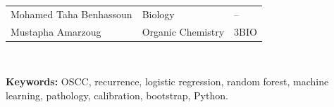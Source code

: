 \documentclass[11pt,a4paper]{article}
\begin{document}
\begin{titlepage}
\begin{tabular}{|l|l|l|}
Mohamed Taha Benhassoun & Biology & -- \\

Mustapha Amarzoug & Organic Chemistry & 3BIO \\

\hline

\end{tabular}\\[1.2cm]


\begin{minipage}{0.85\textwidth}

\textbf{Keywords:} OSCC, recurrence, logistic regression, random forest, machine learning, pathology, calibration, bootstrap, Python.

\end{minipage}\\[1.2cm]

\vfill

\end{titlepage}


\newpage

\setcounter{page}{1}

\begin{center}

\vspace*{-2em}

\end{center}
\end{document}

